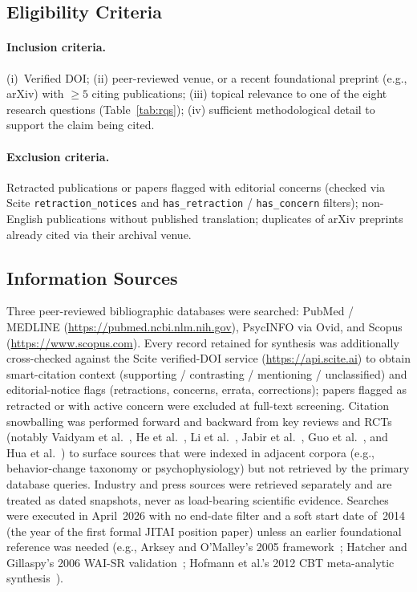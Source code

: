 \documentclass[11pt,a4paper]{article}
\newcommand{\tabref}[1]{Table~\ref{#1}}
\begin{document}
\subsection{Eligibility Criteria}\label{sec:eligibility}

\paragraph{Inclusion criteria.}
(i)~Verified DOI; (ii) peer-reviewed venue, or a recent foundational
preprint (e.g., arXiv) with $\ge\!5$ citing publications; (iii)
topical relevance to one of the eight research questions
(\tabref{tab:rqs}); (iv) sufficient methodological detail to
support the claim being cited.

\paragraph{Exclusion criteria.}
Retracted publications or papers flagged with editorial concerns
(checked via Scite \texttt{retraction\_notices} and
\texttt{has\_retraction} / \texttt{has\_concern} filters);
non-English publications without published translation; duplicates
of arXiv preprints already cited via their archival venue.

\subsection{Information Sources}\label{sec:sources}

Three peer-reviewed bibliographic databases were searched: PubMed /
MEDLINE (\url{https://pubmed.ncbi.nlm.nih.gov}), PsycINFO via Ovid,
and Scopus (\url{https://www.scopus.com}). Every record retained for
synthesis was additionally cross-checked against the Scite
verified-DOI service (\url{https://api.scite.ai}) to obtain
smart-citation context (supporting / contrasting / mentioning /
unclassified) and editorial-notice flags (retractions, concerns,
errata, corrections); papers flagged as retracted or with active
concern were excluded at full-text screening. Citation snowballing
was performed forward and backward from key reviews and RCTs
(notably Vaidyam et al.~\cite{Vaidyam2019ChatbotsReview,Vaidyam2021ChatbotLandscape},
He et al.~\cite{He2023CASRMeta}, Li et al.~\cite{Li2023AICAMeta},
Jabir et al.~\cite{Jabir2024AttritionMeta}, Guo et
al.~\cite{Guo2024LLMMHReview}, and Hua et
al.~\cite{Hua2025LLMScopingReview}) to surface sources that were
indexed in adjacent corpora (e.g., behavior-change taxonomy or
psychophysiology) but not retrieved by the primary database queries.
Industry and press sources were retrieved separately and are
treated as dated snapshots, never as load-bearing scientific
evidence. Searches were executed in April~2026 with no end-date
filter and a soft start date of~2014 (the year of the first formal
JITAI position paper) unless an earlier foundational reference was
needed (e.g., Arksey and O'Malley's 2005
framework~\cite{Arksey2005Scoping}; Hatcher and Gillaspy's 2006
WAI-SR validation~\cite{Hatcher2006WAISR}; Hofmann et al.'s 2012
CBT meta-analytic synthesis~\cite{Hofmann2012CBTMeta}).
\end{document}
